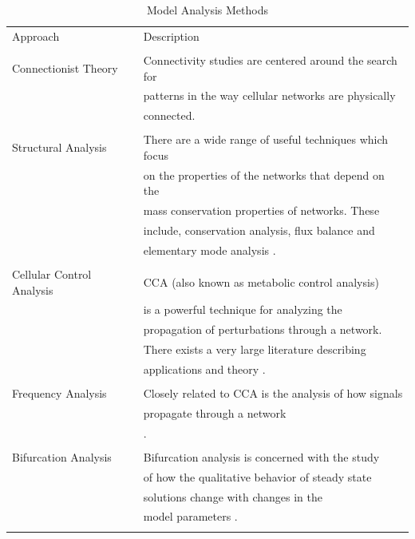 \documentclass[12pt]{article}
\begin{document}
{\begin{table}[h]
\label{table:techniques}
\begin{tabular}{ll}
\rowcolor[gray]{0.8}\color{black}
Approach & Description \\ \\
Connectionist Theory & Connectivity studies are centered around the search for \\
                     & patterns in the way cellular networks are physically \\
                     & connected. \cite{BarabasiReview2004} \\
                     &  \\
Structural Analysis & There are a wide range of useful techniques which focus \\
                    & on the properties of the networks that depend on the \\
                    & mass conservation properties of networks. These \\
                    & include, conservation analysis, flux balance and \\
                    & elementary mode analysis \cite{Schuster:Book}. \\
                    & \\
Cellular Control Analysis & CCA (also known as metabolic control analysis) \\
                    & is a powerful technique for analyzing the \\
                    & propagation of perturbations through a network. \\
                    & There exists a very large literature describing \\
                    & applications and theory \cite{Fell:Book}. \\
                    & \\
Frequency Analysis  & Closely related to CCA is the analysis of how signals \\
                    & propagate through a network \\
                    & \cite{Ingalls2004,RaoSauroArkin}. \\
                    & \\
Bifurcation Analysis & Bifurcation analysis is concerned with the study \\
                     & of how the qualitative behavior of steady state \\
                     & solutions change with changes in the \\
                     & model parameters \cite{TysonNatReview2001}. \\
\\ \hline
\end{tabular}
\caption{Model Analysis Methods}
\end{table}

}
\end{document}
